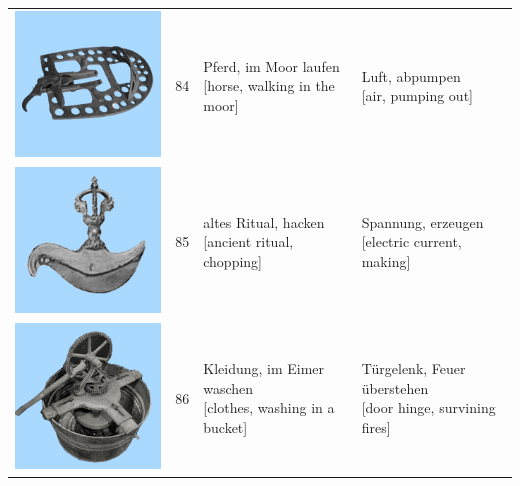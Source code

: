 \documentclass[
  english,
  man,floatsintext]{apa7}
\begin{document}
\begin{center}
\begin{ThreePartTable}
{\begin{longtable}{llll}
\includegraphics[valign=c, scale=0.23]{../materials/unfamiliar/84.png} & 84 & \makecell[l]{Pferd, im Moor laufen\\{[horse, walking in the moor]}} & \makecell[l]{Luft, abpumpen\\{[air, pumping out]}}\\
\includegraphics[valign=c, scale=0.23]{../materials/unfamiliar/85.png} & 85 & \makecell[l]{altes Ritual, hacken\\{[ancient ritual, chopping]}} & \makecell[l]{Spannung, erzeugen\\{[electric current, making]}}\\
\includegraphics[valign=c, scale=0.23]{../materials/unfamiliar/86.png} & 86 & \makecell[l]{Kleidung, im Eimer waschen\\{[clothes, washing in a bucket]}} & \makecell[l]{Türgelenk, Feuer überstehen\\{[door hinge, survining fires]}}\\

\end{longtable}}
\end{ThreePartTable}
\end{center}
\end{document}
